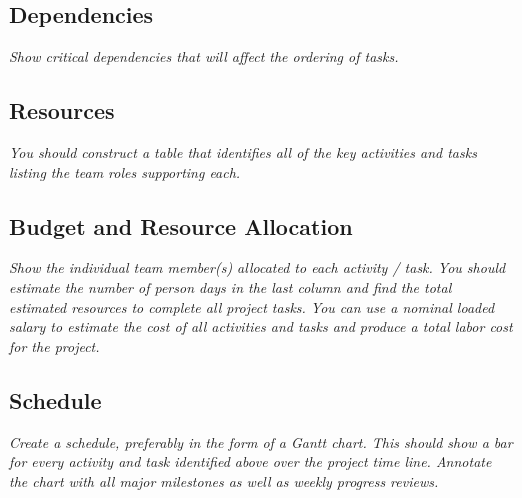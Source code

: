 \documentclass[11pt]{article}
\begin{document}
\subsection{Dependencies}
{\it Show critical dependencies that will affect the ordering of tasks. }
\subsection{Resources}
{\it You should construct a table that identifies all of the key activities and tasks listing the team
roles supporting each.}
\subsection{Budget and Resource Allocation}
{\it Show the individual team member(s) allocated to each activity / task.  You should estimate the
number of person days in the last column and find the total estimated resources to complete all
project tasks.  You can use a nominal loaded salary to estimate the cost of all activities and tasks
and produce a total labor cost for the project.}
\subsection{Schedule}
{\it Create a schedule, preferably in the form of a Gantt chart.  This should show a bar for every
activity and task identified above over the project time line.  Annotate the chart with all major
milestones as well as weekly progress reviews.}


\end{document}
